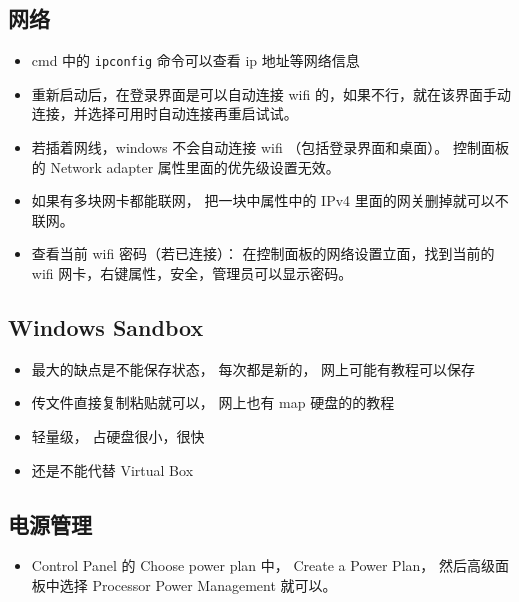 \subsection{网络}
\begin{itemize}
\item cmd 中的 \verb|ipconfig| 命令可以查看 ip 地址等网络信息
\item 重新启动后，在登录界面是可以自动连接 wifi 的，如果不行，就在该界面手动连接，并选择可用时自动连接再重启试试。
\item 若插着网线，windows 不会自动连接 wifi （包括登录界面和桌面）。 控制面板的 Network adapter 属性里面的优先级设置无效。
\item 如果有多块网卡都能联网， 把一块中属性中的 IPv4 里面的网关删掉就可以不联网。
\item 查看当前 wifi 密码（若已连接）： 在控制面板的网络设置立面，找到当前的 wifi 网卡，右键属性，安全，管理员可以显示密码。
\end{itemize}

\subsection{Windows Sandbox}
\begin{itemize}
\item 最大的缺点是不能保存状态， 每次都是新的， 网上可能有教程可以保存
\item 传文件直接复制粘贴就可以， 网上也有 map 硬盘的的教程
\item 轻量级， 占硬盘很小，很快
\item 还是不能代替 Virtual Box
\end{itemize}

\subsection{电源管理}
\begin{itemize}
\item Control Panel 的 Choose power plan 中， Create a Power Plan， 然后高级面板中选择 Processor Power Management 就可以。
\end{itemize}
